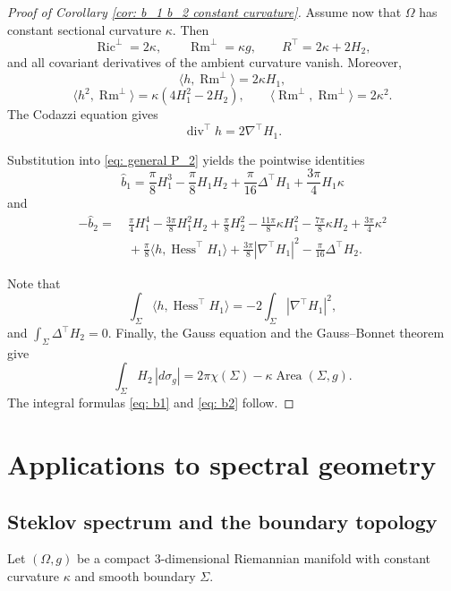 \documentclass[11pt]{amsart}
\newcommand{\dvg}{\operatorname{div}}
\newcommand{\Hess}{\operatorname{Hess}}
\newcommand{\Area}{\operatorname{Area}}
\newcommand{\Ric}{\operatorname{Ric}}
\newcommand{\Rm}{\operatorname{Rm}}
\theoremstyle{definition}
\numberwithin{equation}{section}
\begin{document}
\begin{proof}[Proof of Corollary \ref{cor: b_1 b_2 constant curvature}]
Assume now that $\Omega$ has constant sectional curvature $\kappa$.
Then
\[\Ric^\bot=2\kappa, \qquad\Rm^\bot=\kappa g, \qquad R^\top=2\kappa+2H_2,\]
and all covariant derivatives of the ambient curvature vanish. Moreover,
\[\langle h,\Rm^\bot\rangle=2\kappa  H_1,\]
\[\langle  h^2,\Rm^\bot\rangle=\kappa(4 H_1^2-2  H_2), \qquad\langle\Rm^\bot,\Rm^\bot\rangle=2\kappa^2.\]
The Codazzi equation gives
\[\dvg^\top h=2\nabla^\top H_1.\]

Substitution into \eqref{eq: general P_2} yields the pointwise identities
\[\widehat b_1 = \frac{\pi}{8} H_1^3 - \frac{\pi}{8}H_1H_2 + \frac{\pi}{16}\Delta^\top H_1 + \frac{3\pi}{4}H_1\kappa\]
and
\begin{align*}
-\widehat b_2 = &\
\frac{\pi}{4} H_1^4 - \frac{3\pi}{8} H_1^2  H_2 + \frac{\pi}{8} H_2^2 - \frac{11\pi}{8}\kappa H_1^2 - \frac{7\pi}{8}\kappa H_2 + \frac{3\pi}{4}\kappa^2 \\
&\ +\frac{\pi}{8}\langle h,\Hess^\top H_1\rangle + \frac{3\pi}{8}|\nabla^\top H_1|^2 - \frac{\pi}{16}\Delta^\top H_2.
\end{align*} 

Note that
\[\int_\Sigma\langle h,\operatorname{Hess}^\top H_1\rangle = -2\int_\Sigma|\nabla^\top H_1|^2,\]
and $\int_\Sigma\Delta^\top H_2=0$.  
Finally, the Gauss equation and the Gauss--Bonnet theorem give
\[\int_\Sigma H_2\,|d\sigma_g|=2\pi\chi(\Sigma)-\kappa\Area(\Sigma,g).\] 
The integral formulas \eqref{eq: b1} and \eqref{eq: b2} follow.
\end{proof}

\section{Applications to spectral geometry}\label{sec:apptoSpecGeom}


\subsection{Steklov spectrum and the boundary topology}

Let $(\Omega,g)$ be a compact $3$-dimensional Riemannian manifold with constant curvature $\kappa$ and smooth boundary $\Sigma$.  
\end{document}

